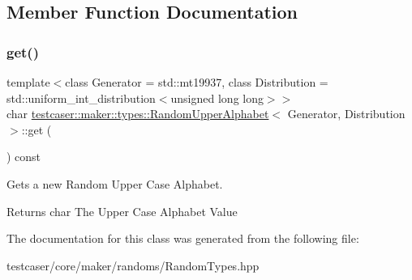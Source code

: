 \subsection{Member Function Documentation}
\mbox{\label{classtestcaser_1_1maker_1_1types_1_1RandomUpperAlphabet_a682af9423088caffe8619113b6a6c1b0}} 
\subsubsection{\texorpdfstring{get()}{get()}}
{\footnotesize\ttfamily template$<$class Generator = std\+::mt19937, class Distribution = std\+::uniform\+\_\+int\+\_\+distribution$<$unsigned long long$>$$>$ \\
char \hyperlink{classtestcaser_1_1maker_1_1types_1_1RandomUpperAlphabet}{testcaser\+::maker\+::types\+::\+Random\+Upper\+Alphabet}$<$ Generator, Distribution $>$\+::get (\begin{DoxyParamCaption}{ }\end{DoxyParamCaption}) const\hspace{0.3cm}{\ttfamily [inline]}}



Gets a new Random Upper Case Alphabet. 

\begin{DoxyReturn}{Returns}
char The Upper Case Alphabet Value 
\end{DoxyReturn}


The documentation for this class was generated from the following file\+:\begin{DoxyCompactItemize}
\item 
testcaser/core/maker/randoms/Random\+Types.\+hpp\end{DoxyCompactItemize}
